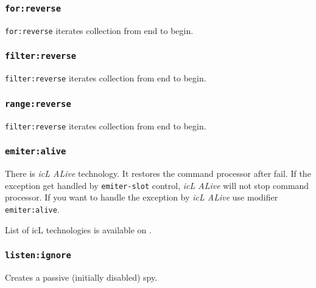 \subsubsection{\texttt{for:reverse}}

\texttt{for:reverse} iterates collection from end to begin.

\subsubsection{\texttt{filter:reverse}}

\texttt{filter:reverse} iterates collection from end to begin.

\subsubsection{\texttt{range:reverse}}

\texttt{filter:reverse} iterates collection from end to begin.

\subsubsection{\texttt{emiter:alive}}

There is \textit{icL ALive} technology. It restores the command processor after fail. If the exception get handled by \texttt{emiter-slot} control, \textit{icL ALive} will not stop command processor. If you want to handle the exception by \textit{icL ALive} use modifier \texttt{emiter:alive}.

List of icL technologies is available on .

\subsubsection{\texttt{listen:ignore}}

Creates a passive (initially disabled) spy.
